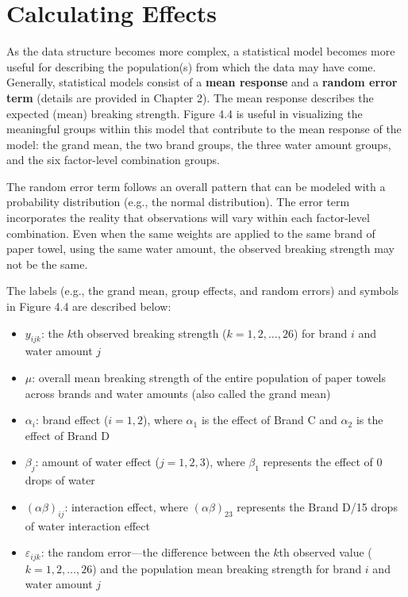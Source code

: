 \documentclass[
]{report}
\providecommand{\tightlist}{%
  \setlength{\itemsep}{0pt}\setlength{\parskip}{0pt}}
\theoremstyle{definition}
\theoremstyle{definition}
\theoremstyle{definition}
\theoremstyle{definition}
\theoremstyle{remark}
\begin{document}
\hypertarget{calculating-effects}{%
\section{Calculating Effects}\label{calculating-effects}}

As the data structure becomes more complex, a statistical model becomes more useful for describing the population(s) from which the data may have come. Generally, statistical models consist of a \textbf{mean response} and a \textbf{random error term} (details are provided in Chapter 2). The mean response describes the expected (mean) breaking strength. Figure 4.4 is useful in visualizing the meaningful groups within this model that contribute to the mean response of the model: the grand mean, the two brand groups, the three water amount groups, and the six factor-level combination groups.

The random error term follows an overall pattern that can be modeled with a probability distribution (e.g., the normal distribution). The error term incorporates the reality that observations will vary within each factor-level combination. Even when the same weights are applied to the same brand of paper towel, using the same water amount, the observed breaking strength may not be the same.

The labels (e.g., the grand mean, group effects, and random errors) and symbols in Figure 4.4 are described below:

\begin{itemize}
\tightlist
\item
  \(y_{ijk}\): the \(k\)th observed breaking strength (\(k = 1, 2, \dots, 26\)) for brand \(i\) and water amount \(j\)\\
\item
  \(\mu\): overall mean breaking strength of the entire population of paper towels across brands and water amounts (also called the grand mean)\\
\item
  \(\alpha_i\): brand effect (\(i = 1, 2\)), where \(\alpha_1\) is the effect of Brand C and \(\alpha_2\) is the effect of Brand D\\
\item
  \(\beta_j\): amount of water effect (\(j = 1, 2, 3\)), where \(\beta_1\) represents the effect of 0 drops of water\\
\item
  \((\alpha\beta)_{ij}\): interaction effect, where \((\alpha\beta)_{23}\) represents the Brand D/15 drops of water interaction effect\\
\item
  \(\varepsilon_{ijk}\): the random error---the difference between the \(k\)th observed value (\(k = 1, 2, \dots, 26\)) and the population mean breaking strength for brand \(i\) and water amount \(j\)
\end{itemize}
\end{document}

